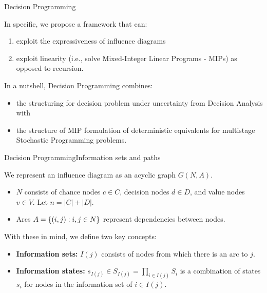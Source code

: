 \documentclass[mathserif,aspectratio=149]{beamer}
\begin{document}
\begin{frame}{Decision Programming}

In specific, we propose a framework that can:
%
\begin{enumerate}
    \item exploit the \alert{expressiveness} of influence diagrams
    \item exploit \alert{linearity} (i.e., solve Mixed-Integer Linear Programs - MIPs) as opposed to \alert{recursion}. 
\end{enumerate}

\pause
In a nutshell, \alert{Decision Programming} combines:
\begin{itemize} 
    \item the structuring for decision problem under uncertainty from \alert{Decision Analysis} with 
    \item the structure of MIP formulation of deterministic equivalents for multistage \alert{Stochastic Programming} problems.
\end{itemize}


\end{frame}


\begin{frame}{Decision Programming}{Information sets and paths}

We represent an \alert{influence diagram} as an acyclic graph $G(N,A)$.
\begin{itemize}
    \item $N$ consists of chance nodes $c \in C$, decision nodes $d \in D$, and value nodes $v \in V$. Let $n = |C| + |D|$.
    \item Arcs $A = \left\{ (i,j) : i,j \in N \right \}$ represent \alert{dependencies} between nodes.
\end{itemize}

\pause
With these in mind, we define \alert{two key concepts}:
\begin{itemize}
\item {\bf Information sets:} $I(j)$ consists of nodes from which there is an arc to $j$.
\item {\bf Information states:} $s_{I(j)} \in S_{I(j)} = \prod_{i \in I(j)}S_i$ is a combination of states $s_i$ for nodes in the information set of $i \in I(j)$.
\end{itemize}

\end{frame}
\end{document}
